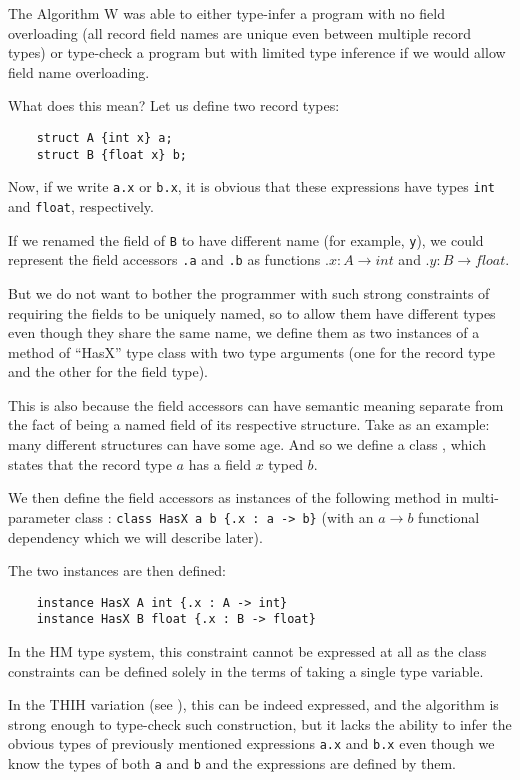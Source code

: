The Algorithm W was able to either type-infer a program with no field overloading (all record field names are unique even between multiple record types) or type-check a program but with limited type inference if we would allow field name overloading.

What does this mean? Let us define two record types:

\begin{lstlisting}
    struct A {int x} a;
    struct B {float x} b;
\end{lstlisting}

Now, if we write \lstinline{a.x} or \lstinline{b.x}, it is obvious that these expressions have types \lstinline{int} and \lstinline{float}, respectively.

If we renamed the field of \lstinline{B} to have different name (for example, \lstinline{y}), we could represent the field accessors \lstinline{.a} and \lstinline{.b} as functions $.x : A \to int$ and $.y : B \to float$.

But we do not want to bother the programmer with such strong constraints of requiring the fields to be uniquely named, so to allow them have different types even though they share the same name, we define them as two instances of a method of ``HasX'' type class with two type arguments (one for the record type and the other for the field type).

This is also because the field accessors can have semantic meaning separate from the fact of being a named field of its respective structure. Take  as an example: many different structures can have some age. And so we define a class , which states that the record type $a$ has a field $x$ typed $b$.

We then define the field accessors  as instances of the following method in multi-parameter class : \lstinline|class HasX a b {.x : a -> b}| (with an $a \to b$ functional dependency which we will describe later).

The two instances are then defined:

\begin{lstlisting}
    instance HasX A int {.x : A -> int}
    instance HasX B float {.x : B -> float}
\end{lstlisting}

In the HM type system, this constraint cannot be expressed at all as the class constraints can be defined solely in the terms of taking a single type variable.

In the THIH variation (see \cite{jones1999typing}), this can be indeed expressed, and the algorithm is strong enough to type-check such construction, but it lacks the ability to infer the obvious types of previously mentioned expressions \lstinline{a.x} and \lstinline{b.x} even though we know the types of both \lstinline{a} and \lstinline{b} and the expressions are defined by them.

